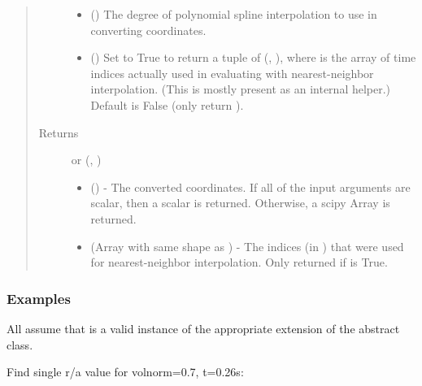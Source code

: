 \documentclass[letterpaper,10pt,english]{sphinxmanual}
\begin{document}
\begin{fulllineitems}
\begin{fulllineitems}
\begin{quote}
\begin{description}
\begin{itemize}
\item {} 
 () \textendash{} The degree of polynomial spline interpolation to
use in converting coordinates.

\item {} 
 () \textendash{} Set to True to return a tuple of (,
), where  is the array of time indices
actually used in evaluating  with nearest-neighbor
interpolation. (This is mostly present as an internal helper.)
Default is False (only return ).

\end{itemize}

\item[{Returns}] \leavevmode

 or (, )
\begin{itemize}
\item {} 
 () - The converted coordinates. If
all of the input arguments are scalar, then a scalar is returned.
Otherwise, a scipy Array is returned.

\item {} 
 (Array with same shape as ) - The indices
(in ) that were used for
nearest-neighbor interpolation. Only returned if  is
True.

\end{itemize}


\end{description}\end{quote}
\subsubsection*{Examples}

All assume that  is a valid instance of the appropriate
extension of the {\hyperref[\detokenize{eqtools:eqtools.core.Equilibrium}]{}} abstract class.

Find single r/a value for volnorm=0.7, t=0.26s:


\end{fulllineitems}
\end{fulllineitems}
\end{document}

